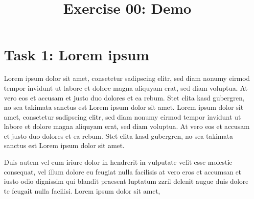 \documentclass[	
english, 		
smallborders 	
]{../i6prcsht}
\begin{document}
\title{Exercise 00: Demo}
\maketitle

\section*{Task 1: Lorem ipsum}
Lorem ipsum dolor sit amet, consetetur sadipscing elitr, sed diam nonumy eirmod tempor invidunt ut labore et dolore magna aliquyam erat, sed diam voluptua. At vero eos et accusam et justo duo dolores et ea rebum. Stet clita kasd gubergren, no sea takimata sanctus est Lorem ipsum dolor sit amet. Lorem ipsum dolor sit amet, consetetur sadipscing elitr, sed diam nonumy eirmod tempor invidunt ut labore et dolore magna aliquyam erat, sed diam voluptua. At vero eos et accusam et justo duo dolores et ea rebum. Stet clita kasd gubergren, no sea takimata sanctus est Lorem ipsum dolor sit amet.

\begin{solution}
  Duis autem vel eum iriure dolor in hendrerit in vulputate velit esse molestie consequat, vel illum dolore eu feugiat nulla facilisis at vero eros et accumsan et iusto odio dignissim qui blandit praesent luptatum zzril delenit augue duis dolore te feugait nulla facilisi. Lorem ipsum dolor sit amet,
\end{solution}
\end{document}
